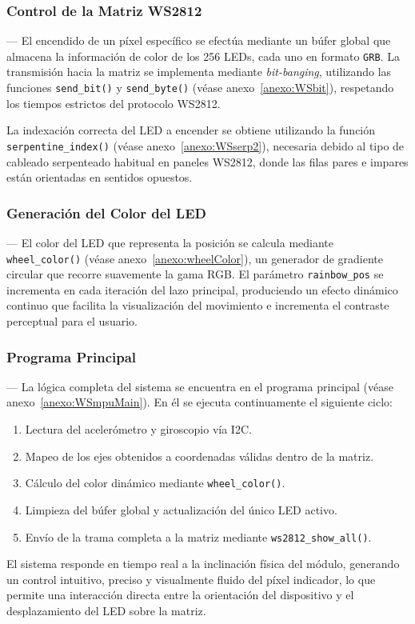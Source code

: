 \vspace{1em}

\subsubsection{Control de la Matriz WS2812} ---
El encendido de un píxel específico se efectúa mediante un búfer global que almacena la información de color de los 256 LEDs, cada uno en formato \texttt{GRB}. La transmisión hacia la matriz se implementa mediante \textit{bit-banging}, utilizando las funciones \texttt{send\_bit()} y \texttt{send\_byte()} (véase anexo~\ref{anexo:WSbit}), respetando los tiempos estrictos del protocolo WS2812.

La indexación correcta del LED a encender se obtiene utilizando la función \texttt{serpentine\_index()} (véase anexo~\ref{anexo:WSserp2}), necesaria debido al tipo de cableado serpenteado habitual en paneles WS2812, donde las filas pares e impares están orientadas en sentidos opuestos.

\vspace{1em}

\subsubsection{Generación del Color del LED} ---
El color del LED que representa la posición se calcula mediante \texttt{wheel\_color()} (véase anexo~\ref{anexo:wheelColor}), un generador de gradiente circular que recorre suavemente la gama RGB. El parámetro \texttt{rainbow\_pos} se incrementa en cada iteración del lazo principal, produciendo un efecto dinámico continuo que facilita la visualización del movimiento e incrementa el contraste perceptual para el usuario.

\vspace{1em}

\subsubsection{Programa Principal} ---
La lógica completa del sistema se encuentra en el programa principal (véase anexo~\ref{anexo:WSmpuMain}). En él se ejecuta continuamente el siguiente ciclo:

\begin{enumerate}
    \item Lectura del acelerómetro y giroscopio vía I2C.
    \item Mapeo de los ejes obtenidos a coordenadas válidas dentro de la matriz.
    \item Cálculo del color dinámico mediante \texttt{wheel\_color()}.
    \item Limpieza del búfer global y actualización del único LED activo.
    \item Envío de la trama completa a la matriz mediante \texttt{ws2812\_show\_all()}.
\end{enumerate}

El sistema responde en tiempo real a la inclinación física del módulo, generando un control intuitivo, preciso y visualmente fluido del píxel indicador, lo que permite una interacción directa entre la orientación del dispositivo y el desplazamiento del LED sobre la matriz.
